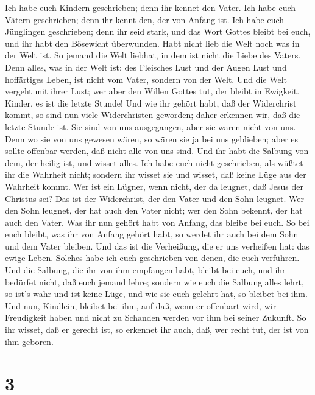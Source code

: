  Ich habe euch Kindern geschrieben; denn ihr kennet den
Vater. Ich habe euch Vätern geschrieben; denn ihr kennt den, der von
Anfang ist. Ich habe euch Jünglingen geschrieben; denn ihr seid stark,
und das Wort Gottes bleibt bei euch, und ihr habt den Bösewicht
überwunden.  Habt nicht lieb die Welt noch was in der Welt
ist. So jemand die Welt liebhat, in dem ist nicht die Liebe des Vaters.
 Denn alles, was in der Welt ist: des Fleisches Lust und
der Augen Lust und hoffärtiges Leben, ist nicht vom Vater, sondern von
der Welt.  Und die Welt vergeht mit ihrer Lust; wer aber
den Willen Gottes tut, der bleibt in Ewigkeit.  Kinder, es
ist die letzte Stunde! Und wie ihr gehört habt, daß der Widerchrist
kommt, so sind nun viele Widerchristen geworden; daher erkennen wir, daß
die letzte Stunde ist.  Sie sind von uns ausgegangen, aber
sie waren nicht von uns. Denn wo sie von uns gewesen wären, so wären sie
ja bei uns geblieben; aber es sollte offenbar werden, daß nicht alle von
uns sind.  Und ihr habt die Salbung von dem, der heilig
ist, und wisset alles.  Ich habe euch nicht geschrieben,
als wüßtet ihr die Wahrheit nicht; sondern ihr wisset sie und wisset,
daß keine Lüge aus der Wahrheit kommt.  Wer ist ein Lügner,
wenn nicht, der da leugnet, daß Jesus der Christus sei? Das ist der
Widerchrist, der den Vater und den Sohn leugnet.  Wer den
Sohn leugnet, der hat auch den Vater nicht; wer den Sohn bekennt, der
hat auch den Vater.  Was ihr nun gehört habt von Anfang,
das bleibe bei euch. So bei euch bleibt, was ihr von Anfang gehört habt,
so werdet ihr auch bei dem Sohn und dem Vater bleiben.  Und
das ist die Verheißung, die er uns verheißen hat: das ewige Leben.
 Solches habe ich euch geschrieben von denen, die euch
verführen.  Und die Salbung, die ihr von ihm empfangen
habt, bleibt bei euch, und ihr bedürfet nicht, daß euch jemand lehre;
sondern wie euch die Salbung alles lehrt, so ist's wahr und ist keine
Lüge, und wie sie euch gelehrt hat, so bleibet bei ihm. 
Und nun, Kindlein, bleibet bei ihm, auf daß, wenn er offenbart wird, wir
Freudigkeit haben und nicht zu Schanden werden vor ihm bei seiner
Zukunft.  So ihr wisset, daß er gerecht ist, so erkennet
ihr auch, daß, wer recht tut, der ist von ihm geboren.

\hypertarget{section-2}{%
\section{3}\label{section-2}}


